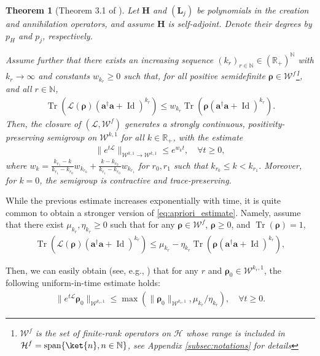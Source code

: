 \documentclass{article}
\newtheorem{theorem}{Theorem}
\newcommand{\xL}{\mathcal{L}}
\newcommand{\xH}{\mathcal{H}}
\newcommand{\xtr}[1]{\operatorname{Tr}\left( #1 \right)}
\newcommand{\xN}{\mathbb{N}}
\newcommand{\xW}{\mathcal{W}}
\let\bf\boldsymbol
\newcommand{\Id}{\operatorname{Id}}
\newcommand{\orho}{{\bf \rho}}
\newcommand{\oa}{{\bf a}}
\newcommand{\oL}{{\bf L}}
\newcommand{\oH}{{\bf H}}
\begin{document}
\begin{theorem}[Theorem 3.1 of \cite{gondolfEnergyPreservingEvolutions2024}]
\label{th_apriori_single_mode}
Let $\oH$ and $(\oL_j)$ be polynomials in the creation and annihilation operators, and assume $\oH$ is self-adjoint. Denote their degrees by $p_H$ and $p_j$, respectively.

Assume further that there exists an increasing sequence $(k_r)_{r\in \xN}\in (\mathbb{R}_+)^\mathbb{N}$ with $k_r \to \infty$ and constants $w_{k_r} \geq 0$ such that, for all positive semidefinite $\orho \in \xW^f$\footnote{$\xW^f$ is the set of finite-rank operators on $\xH$ whose range is included in $\xH^f=\text{span}\{\ket{n}, n \in \mathbb{N}\}$, see Appendix \ref{subsec:notations} for details}, and all $r \in \xN$,
\begin{align}
    \label{eq:apriori_estimate}
    \xtr{\xL(\orho)(\oa^\dag \oa+ \Id)^{k_r}} \leq w_{k_r} \xtr{\orho (\oa^\dag \oa+ \Id)^{k_r}}.
\end{align}
Then, the closure of $(\xL, \xW^f)$ generates a strongly continuous, positivity-preserving semigroup on $\xW^{k,1}$ for all $k \in \mathbb{R}_+$, with the estimate
\begin{align}
    \|e^{t\xL}\|_{\xW^{k,1}\to \xW^{k,1}} \leq e^{w_k t }, \quad \forall t \geq 0,
\end{align}
where $w_k = \frac{k_{r_1}-k}{k_{r_1}-k_{r_0}}w_{k_{r_0}} + \frac{k-k_{r_0}}{k_{r_1}-k_{r_0}}w_{k_{r_1}}$ for $r_0, r_1$ such that $k_{r_0} \leq k < k_{r_1}$. Moreover, for $k = 0$, the semigroup is contractive and trace-preserving.
\end{theorem}

While the previous estimate increases exponentially with time, it is quite common to obtain a stronger version of \cref{eq:apriori_estimate}. Namely, assume that there exist $\mu_{k_r},\eta_{k_r}\geq 0$ such that for any $\orho \in \xW^f$, $\orho \geq 0$, and $\xtr{\orho}=1$,
\begin{align}
    \label{eq:apriori_estimate_}
    \xtr{\xL(\orho)(\oa^\dag \oa+ \Id)^{k_r}} \leq \mu_{k_r} -\eta_{k_r} \xtr{\orho (\oa^\dag \oa+ \Id)^{k_r}},
\end{align}

Then, we can easily obtain (see, e.g., \cite[Prop. 4.1]{gondolfEnergyPreservingEvolutions2024}) that for any $r$ and $\orho_0 \in \xW^{k_r,1}$, the following uniform-in-time estimate holds:
\begin{align}
    \| e^{t\xL}\orho_0 \|_{\xW^{k_r,1}} \leq \max( \|\orho_0\|_{\xW^{k_r,1}}, \mu_{k_r}/\eta_{k_r}), \quad \forall t \geq 0.
\end{align}
\end{document}
